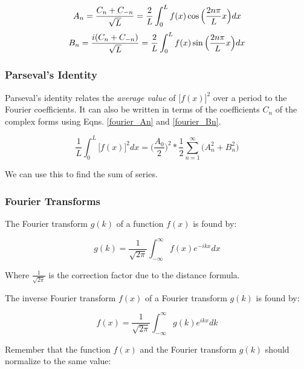 \documentclass[]{article}
\begin{document}
\begin{equation}
\label{fourier_An}
    A_n = \frac{C_n + C_{-n}}{\sqrt{L}} = \frac{2}{L}\int_0^L{f(x)\cos{\Big{(}\frac{2n\pi}{L}x\Big{)}}dx}
\end{equation}
\begin{equation}
\label{fourier_Bn}
    B_n = \frac{i(C_n + C_{-n})}{\sqrt{L}} = \frac{2}{L}\int_0^L{f(x)\sin{\Big{(}\frac{2n\pi}{L}x\Big{)}}dx}
\end{equation}

\subsubsection{Parseval's Identity}

Parseval's identity relates the \emph{average value} of $\big[f(x)\big]^2$ over a period to the Fourier coefficients. It can also be written in terms of the coefficients $C_n$ of the complex forms using Eqns. \ref{fourier_An} and \ref{fourier_Bn}.

\begin{equation}
    \frac{1}{L}\int_0^L{\big[f(x)\big]^2 dx} = \Big(\frac{A_0}{2}\Big)^2 * \frac{1}{2}\sum_{n=1}^{\infty}{\Big(A_n^2 + B_n^2\Big)}
\end{equation}

We can use this to find the sum of series. 

\subsubsection{Fourier Transforms}

The Fourier transform $g(k)$ of a function $f(x)$ is found by:

\begin{equation}
    \label{fourier_xform}
    g(k) = \frac{1}{\sqrt{2\pi}} \int_{-\infty}^{\infty}{f(x) e^{-ikx}dx}
\end{equation}

Where $\frac{1}{\sqrt{2\pi}}$ is the correction factor due to the distance formula. 


The inverse Fourier transform $f(x)$ of a Fourier transform $g(k)$ is found by:

\begin{equation}
    \label{fourier_inv_xform}
    f(x) = \frac{1}{\sqrt{2\pi}} \int_{-\infty}^{\infty}{g(k) e^{ikx} dk}
\end{equation}

Remember that the function $f(x)$ and the Fourier transform $g(k)$ should normalize to the same value: 
\end{document}
